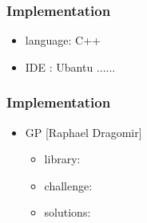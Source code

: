 \documentclass[mathserif]{beamer}
\begin{document}
\begin{frame}
\frametitle{Implementation}

\begin{itemize}
\item language: C++
\item IDE : Ubantu ......
\end{itemize}

\end{frame}


\begin{frame}
\frametitle{Implementation}

\begin{itemize}
\item GP [Raphael Dragomir]
\begin{itemize}
\item library:
\item challenge:
\item solutions:
\end{itemize}
\end{itemize}

\end{frame}
\end{document}
